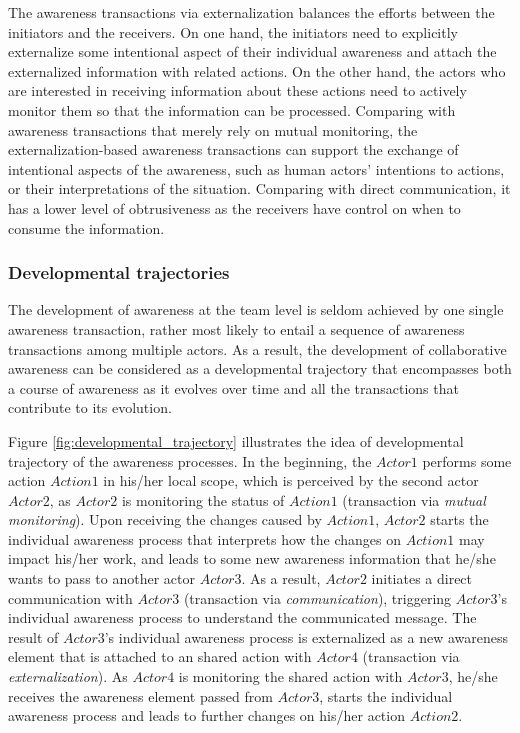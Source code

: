 The awareness transactions via externalization balances the efforts between the initiators and the receivers. On one hand, the initiators need to explicitly externalize some intentional aspect of their individual awareness and attach the externalized information with related actions. On the other hand, the actors who are interested in receiving information about these actions need to actively monitor them so that the information can be processed. Comparing with awareness transactions that merely rely on mutual monitoring, the externalization-based awareness transactions can support the exchange of intentional aspects of the awareness, such as human actors' intentions to actions, or their interpretations of the situation. Comparing with direct communication, it has a lower level of obtrusiveness as the receivers have control on when to consume the information.

\subsubsection{Developmental trajectories} %
\label{ssub:developmental_trajectories}
The development of awareness at the team level is seldom achieved by one single awareness transaction, rather most likely to entail a sequence of awareness transactions among multiple actors. As a result, the development of collaborative awareness can be considered as a developmental trajectory \cite{strauss1993continual} that encompasses both a course of awareness as it evolves over time and all the transactions that contribute to its evolution.

Figure \ref{fig:developmental_trajectory} illustrates the idea of developmental trajectory of the awareness processes. In the beginning, the $Actor1$ performs some action $Action1$ in his/her local scope, which is perceived by the second actor $Actor2$, as $Actor2$ is monitoring the status of $Action1$ (transaction via \emph{mutual monitoring}). Upon receiving the changes caused by $Action1$, $Actor2$ starts the individual awareness process that interprets how the changes on $Action1$ may impact his/her work, and leads to some new awareness information that he/she wants to pass to another actor $Actor3$. As a result, $Actor2$ initiates a direct communication with $Actor3$ (transaction via \emph{communication}), triggering $Actor3$'s individual awareness process to understand the communicated message. The result of $Actor3$'s individual awareness process is externalized as a new awareness element that is attached to an shared action with $Actor4$ (transaction via \emph{externalization}). As $Actor4$ is monitoring the shared action with $Actor3$, he/she receives the awareness element passed from $Actor3$, starts the individual awareness process and leads to further changes on his/her action $Action2$.

